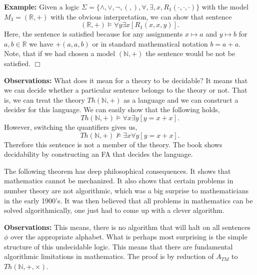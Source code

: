 \documentclass[a4paper,blends,pdf,colorBG,slideColor]{prosper}
\begin{document}
{\bf Example:} Given a logic $\Sigma = \{ \wedge, \vee, \neg, (, ), \forall, \exists, x, R_1(\cdot,\cdot,\cdot) \}$
with the model $M_3 = ({\mathbb R}, +)$ with the obvious interpretation, we can show that
sentence
\[
({\mathbb R}, +) \models \forall y \exists x[R_1(x,x,y)].
\]
Here, the sentence is  satisfied because for any assignments $x \mapsto a$ and $y \mapsto b$ for $a,b \in {\mathbb R}$
we have $+(a,a,b)$ or in standard mathematical notation $b = a + a$. 
Note, that if we had chosen a model $({\mathbb N}, +)$ the sentence would be not be satisfied. $\Box$
\es


{\bf Observations:} What does it mean for a theory to be decidable? It means that we can
decide whether a particular sentence belongs to the theory or not.  That is, we can treat the theory
$Th({\mathbb N}, +)$ as a language and we can construct a decider for this language. We can easily show that
the following holds,
\[
Th({\mathbb N}, +) \models \forall x \exists y[y = x + x].
\]
However, switching the quantifiers gives us,
\[
Th({\mathbb N}, +) \not \models \exists x \forall y[y = x + x].
\]
Therefore this sentence is not a member of the theory.
The book shows decidability by constructing an FA that decides the language.

\es


The following theorem has deep philosophical consequences.  It shows that mathematics cannot
be mechanized.  It also shows that certain problems in number theory are not algorithmic, which
was a big surprise to mathematicians in the early 1900's.  It was then believed that all problems in
mathematics can be solved algorithmically, one just had to come up with a clever algorithm.


{\bf Observations:} This means, there is no algorithm that will halt on all sentences $\phi$ over
the appropriate alphabet.  
What is perhaps most surprising is the simple structure of this undecidable logic.
This means that there are fundamental algorithmic limitations in mathematics.
The proof is by reduction of $A_{TM}$ to $Th({\mathbb N}, +, \times)$.
\end{document}
